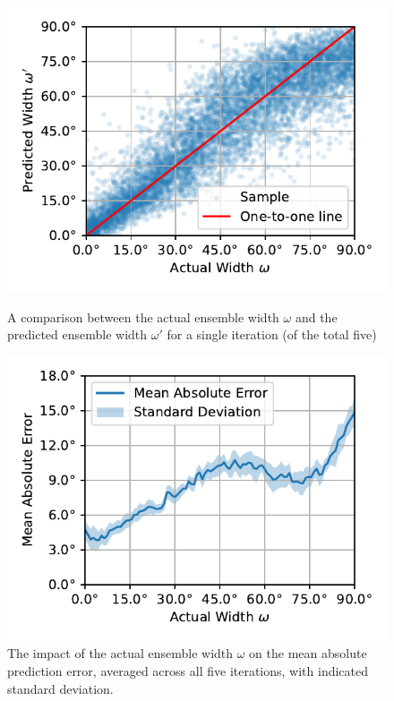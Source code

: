 \documentclass{article}
\begin{document}
\begin{figure}[ht]
  \centering
  \begin{minipage}[t]{0.45\linewidth}
    \includegraphics[width=\linewidth]{../figures/actual_vs_predicted_width.pdf}
    \caption{\label{fig:actual_vs_predicted_width}A comparison between the actual ensemble width $\omega$ and the predicted ensemble width $\omega'$ for a single iteration (of the total five) }
  \end{minipage}
  \hspace{0.5cm}
  \begin{minipage}[t]{0.45\linewidth}
    \includegraphics[width=\linewidth]{../figures/mae_width.pdf}
    \caption{\label{fig:mae_width}The impact of the actual ensemble width $\omega$ on the mean absolute prediction error, averaged across all five iterations, with indicated standard deviation.}
  \end{minipage}
\end{figure}
\end{document}
